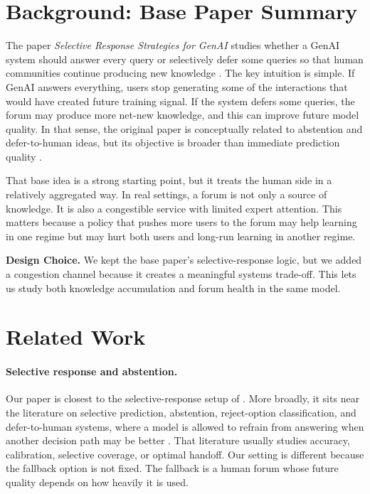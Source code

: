 \documentclass{article}
\newenvironment{designchoice}
  {\begin{framed}\noindent\textbf{Design Choice. }}
  {\end{framed}}
\begin{document}
\section{Background: Base Paper Summary}
The paper \emph{Selective Response Strategies for GenAI} studies whether a GenAI system should answer every query or selectively defer some queries so that human communities continue producing new knowledge \citep{taitler2025selective}. The key intuition is simple. If GenAI answers everything, users stop generating some of the interactions that would have created future training signal. If the system defers some queries, the forum may produce more net-new knowledge, and this can improve future model quality. In that sense, the original paper is conceptually related to abstention and defer-to-human ideas, but its objective is broader than immediate prediction quality \citep{chow1970optimum,herbei2006classification,elyaniv2010foundations}.

That base idea is a strong starting point, but it treats the human side in a relatively aggregated way. In real settings, a forum is not only a source of knowledge. It is also a congestible service with limited expert attention. This matters because a policy that pushes more users to the forum may help learning in one regime but may hurt both users and long-run learning in another regime.

\begin{designchoice}
We kept the base paper's selective-response logic, but we added a congestion channel because it creates a meaningful systems trade-off. This lets us study both knowledge accumulation and forum health in the same model.
\end{designchoice}

\section{Related Work}
\paragraph{Selective response and abstention.}
Our paper is closest to the selective-response setup of \citet{taitler2025selective}. More broadly, it sits near the literature on selective prediction, abstention, reject-option classification, and defer-to-human systems, where a model is allowed to refrain from answering when another decision path may be better \citep{chow1970optimum,herbei2006classification,elyaniv2010foundations,geifman2017selective,madras2018predict,mozannar2020consistent}. That literature usually studies accuracy, calibration, selective coverage, or optimal handoff. Our setting is different because the fallback option is not fixed. The fallback is a human forum whose future quality depends on how heavily it is used.
\end{document}
